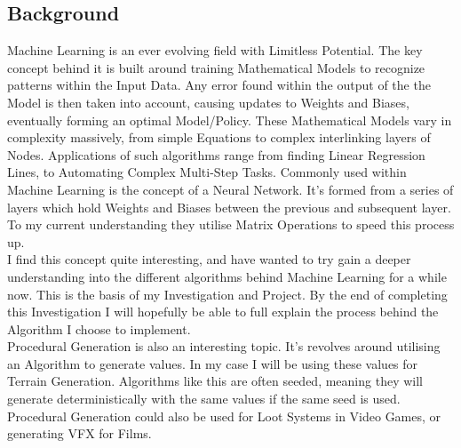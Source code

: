 \begin{flushleft}
        \subsection{Background}
            \vspace{0.2cm}
            Machine Learning is an ever evolving field with Limitless Potential. The key concept behind it is built around training
            Mathematical Models to recognize patterns within the Input Data. Any error found within the output of the the Model is then
            taken into account, causing updates to Weights and Biases, eventually forming an optimal Model/Policy. These Mathematical 
            Models vary in complexity massively, from simple Equations to complex interlinking layers of Nodes. Applications of such 
            algorithms range from finding Linear Regression Lines, to Automating Complex Multi-Step Tasks. Commonly used within Machine 
            Learning is the concept of a Neural Network. It's formed from a series of layers which hold Weights and Biases between the 
            previous and subsequent layer. To my current understanding they utilise Matrix Operations to speed this process up. \\
            \vspace{0.2cm}
            I find this concept quite interesting, and have wanted to try gain a deeper understanding into the different 
            algorithms behind Machine Learning for a while now. This is the basis of my Investigation and Project. By the end
            of completing this Investigation I will hopefully be able to full explain the process behind the Algorithm I choose
            to implement. \\
            \vspace{0.2cm}
            Procedural Generation is also an interesting topic. It's revolves around utilising an Algorithm to generate values. In my 
            case I will be using these values for Terrain Generation. Algorithms like this are often seeded, meaning they will generate 
            deterministically with the same values if the same seed is used. Procedural Generation could also be used for Loot Systems
            in Video Games, or generating VFX for Films.
            \vspace{0.2cm}

\end{flushleft}
